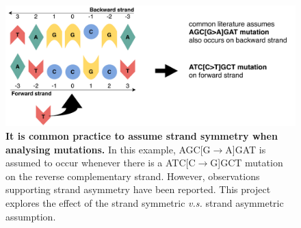 \begin{figure}[h!]
    \centering
    \includegraphics[scale=0.78]{graphics/motif_symmetric_demo.pdf}
    \caption{\textbf{It is common practice to assume strand symmetry when analysing mutations.} In this example, AGC[G$\rightarrow$A]GAT is assumed to occur whenever there is a ATC[C$\rightarrow$G]GCT mutation on the reverse complementary strand. However, observations supporting strand asymmetry have been reported. This project explores the effect of the strand symmetric \textit{v.s.} strand asymmetric assumption.}
    \label{fig:motif_symmetric_demo}
\end{figure}
